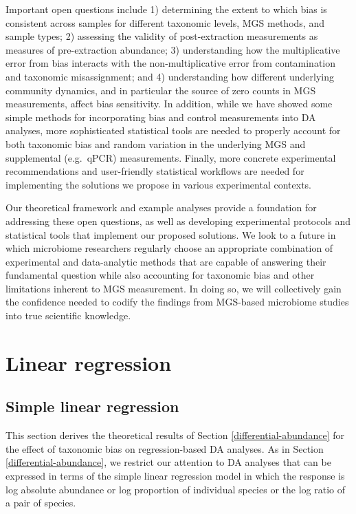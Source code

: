 \documentclass[
]{article}
\begin{document}
Important open questions include 1) determining the extent to which bias is consistent across samples for different taxonomic levels, MGS methods, and sample types; 2) assessing the validity of post-extraction measurements as measures of pre-extraction abundance; 3) understanding how the multiplicative error from bias interacts with the non-multiplicative error from contamination and taxonomic misassignment; and 4) understanding how different underlying community dynamics, and in particular the source of zero counts in MGS measurements, affect bias sensitivity.
In addition, while we have showed some simple methods for incorporating bias and control measurements into DA analyses, more sophisticated statistical tools are needed to properly account for both taxonomic bias and random variation in the underlying MGS and supplemental (e.g.~qPCR) measurements.
Finally, more concrete experimental recommendations and user-friendly statistical workflows are needed for implementing the solutions we propose in various experimental contexts.

Our theoretical framework and example analyses provide a foundation for addressing these open questions, as well as developing experimental protocols and statistical tools that implement our proposed solutions.
We look to a future in which microbiome researchers regularly choose an appropriate combination of experimental and data-analytic methods that are capable of answering their fundamental question while also accounting for taxonomic bias and other limitations inherent to MGS measurement.
In doing so, we will collectively gain the confidence needed to codify the findings from MGS-based microbiome studies into true scientific knowledge.

\clearpage

\hypertarget{appendix-appendix}{%
\appendix {}}


\hypertarget{appendix-regression}{%
\section{Linear regression}\label{appendix-regression}}

\hypertarget{simple-linear-regression}{%
\subsection{Simple linear regression}\label{simple-linear-regression}}

This section derives the theoretical results of Section \ref{differential-abundance} for the effect of taxonomic bias on regression-based DA analyses.
As in Section \ref{differential-abundance}, we restrict our attention to DA analyses that can be expressed in terms of the simple linear regression model in which the response is log absolute abundance or log proportion of individual species or the log ratio of a pair of species.
\end{document}
